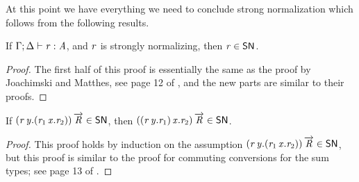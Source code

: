 At this point we have everything we need to conclude strong
normalization which follows from the following results.
\begin{lemma}
  \label{lemma:all_strongly_normalizing_terms_are_in_SN}
  If $\Gamma  ;  \Delta  \vdash  \mathit{r}  :  \mathit{A}$, and $\mathit{r}$ is strongly normalizing, then $\mathit{r} \in \mathsf{SN}$.
\end{lemma}
\begin{proof}
  The first half of this proof is essentially the same as the proof by
  Joachimski and Matthes, see page 12 of \cite{Joachimski:2003}, and
  the new parts are similar to their proofs.
\end{proof}

\begin{lemma}
  \label{lemma:commuting_conversions_in_SN}
  If $(  \mathit{r} \,  \mathit{y} . (  \mathit{r_{{\mathrm{1}}}} \,  \mathit{x} . \mathit{r_{{\mathrm{2}}}}   )   ) \,  \overrightarrow{ \mathit{R} }  \in \mathsf{SN}$, then $(  (  \mathit{r} \,  \mathit{y} . \mathit{r_{{\mathrm{1}}}}   ) \,  \mathit{x} . \mathit{r_{{\mathrm{2}}}}   ) \,  \overrightarrow{ \mathit{R} }  \in \mathsf{SN}$.
\end{lemma}
\begin{proof}
  This proof holds by induction on the assumption $(  \mathit{r} \,  \mathit{y} . (  \mathit{r_{{\mathrm{1}}}} \,  \mathit{x} . \mathit{r_{{\mathrm{2}}}}   )   ) \,  \overrightarrow{ \mathit{R} }  \in \mathsf{SN}$, but this proof is similar to the proof
  for commuting conversions for the sum types; see page 13 of
  \cite{Joachimski:2003}.
\end{proof}

